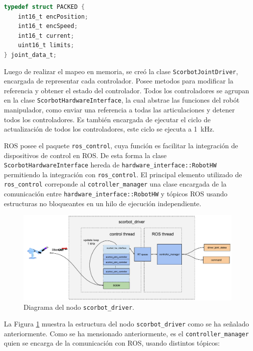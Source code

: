 \begin{description}
\begin{lstlisting}[language=C,style=csstyle, caption=Estructuras de datos usadas para mapear datos de dispositivos esclavos, label=cap4_estructuras]
typedef struct PACKED {
    int16_t encPosition;
    int16_t encSpeed;
    int16_t current;
    uint16_t limits;
} joint_data_t;
\end{lstlisting}

Luego de realizar el mapeo en memoria, se creó la clase \texttt{ScorbotJointDriver}, encargada de representar cada controlador. Posee metodos para modificar la referencia y obtener el estado del controlador. Todos los controladores se agrupan en la clase \texttt{ScorbotHardwareInterface}, la cual abstrae las funciones del robót manipulador, como enviar una referencia a todas las articulaciones y detener todos los controladores. Es también encargada de ejecutar el ciclo de actualización de todos los controladores, este ciclo se ejecuta a \SI{1}{\kilo\hertz}.

ROS posee el paquete \texttt{ros\_control}, cuya función es facilitar la integración de dispositivos de control en ROS. De esta forma la clase \texttt{ScorbotHardwareInterface} hereda de \texttt{hardware\_interface::RobotHW} permitiendo la integración con \texttt{ros\_control}. El principal elemento utilizado de \texttt{ros\_control} correponde al \texttt{cotroller\_manager} una clase encargada de la comunicación entre \texttt{hardware\_interface::RobotHW} y tópicos ROS usando estructuras no bloqueantes en un hilo de ejecución independiente.

\begin{figure}[ht]
  \centering
  \includegraphics[width=\textwidth]{img/cap4/scorbot_driver.pdf}
  \caption{Diagrama del nodo \texttt{scorbot\_driver}.}
  \label{cap4_scorbot_driver}
\end{figure}

La Figura \ref{cap4_scorbot_driver} muestra la estructura del nodo \texttt{scorbot\_driver} como se ha señalado anteriormente. Como se ha mensionado anteriormente, es el \texttt{controller\_manager} quien se encarga de la comunicación con ROS, usando distintos tópicos:

\begin{itemize}


\end{itemize}
\end{description}
